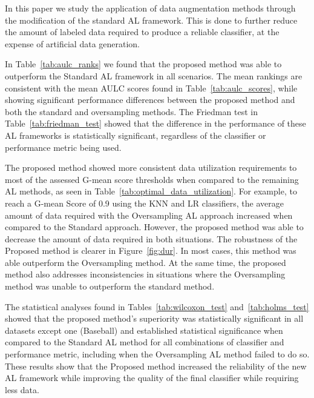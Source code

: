 \documentclass[parskip=full]{scrartcl}
\begin{document}
In this paper we study the application of data augmentation methods through
the modification of the standard AL framework. This is done to further reduce
the amount of labeled data required to produce a reliable classifier, at the
expense of artificial data generation.

In Table~\ref{tab:aulc_ranks} we found that the proposed method was able to
outperform the Standard AL framework in all scenarios. The mean rankings are
consistent with the mean AULC scores found in Table~\ref{tab:aulc_scores},
while showing significant performance differences between the proposed method
and both the standard and oversampling methods. The Friedman test in
Table~\ref{tab:friedman_test} showed that the difference in the performance of
these AL frameworks is statistically significant, regardless of the
classifier or performance metric being used.

The proposed method showed more consistent data utilization requirements to
most of the assessed G-mean score thresholds when compared to the remaining AL
methods, as seen in Table~\ref{tab:optimal_data_utilization}. For example, to
reach a G-mean Score of 0.9 using the KNN and LR classifiers, the average
amount of data required with the Oversampling AL approach increased when
compared to the Standard approach. However, the proposed method was able to
decrease the amount of data required in both situations. The robustness of the
Proposed method is clearer in Figure~\ref{fig:dur}. In most cases, this method
was able outperform the Oversampling method. At the same time, the
proposed method also addresses inconsistencies in situations where the
Oversampling method was unable to outperform the standard method.

The statistical analyses found in Tables~\ref{tab:wilcoxon_test}
and~\ref{tab:holms_test} showed that the proposed method's superiority was
statistically significant in all datasets except one (Baseball) and
established statistical significance when compared to the Standard AL method
for all combinations of classifier and performance metric, including when the
Oversampling AL method failed to do so. These results show that the Proposed
method increased the reliability of the new AL framework while improving the
quality of the final classifier while requiring less data.
\end{document}
